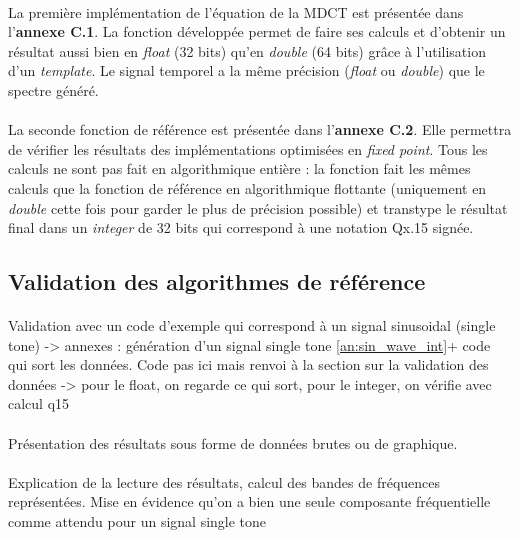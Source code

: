 \documentclass{article}
\begin{document}
    \paragraph{}
    La première implémentation de l'équation de la MDCT est présentée dans l'\textbf{annexe C.1}. La fonction développée permet de faire ses calculs et d'obtenir un résultat aussi bien en \emph{float} (32 bits) qu'en \emph{double} (64 bits) grâce à l'utilisation d'un \emph{template}. Le signal temporel a la même précision (\emph{float} ou \emph{double}) que le spectre généré.

    \paragraph{}
    La seconde fonction de référence est présentée dans l'\textbf{annexe C.2}. Elle permettra de vérifier les résultats des implémentations optimisées en \emph{fixed point}. Tous les calculs ne sont pas fait en algorithmique entière : la fonction fait les mêmes calculs que la fonction de référence en algorithmique flottante (uniquement en \emph{double} cette fois pour garder le plus de précision possible) et transtype le résultat final dans un \emph{integer} de 32 bits qui correspond à une notation Qx.15 signée.

    \subsection{Validation des algorithmes de référence}

    \paragraph{}%
    Validation avec un code d'exemple qui correspond à un signal sinusoidal (single tone) -> annexes : génération d'un signal single tone \ref{an:sin_wave_int}+ code qui sort les données. Code pas ici mais renvoi à la section sur la validation des données -> pour le float, on regarde ce qui sort, pour le integer, on vérifie avec calcul q15


    \paragraph{}%
    Présentation des résultats sous forme de données brutes ou de graphique.

    \paragraph{}%
    Explication de la lecture des résultats, calcul des bandes de fréquences représentées. Mise en évidence qu'on a bien une seule composante fréquentielle comme attendu pour un signal single tone
\end{document}
